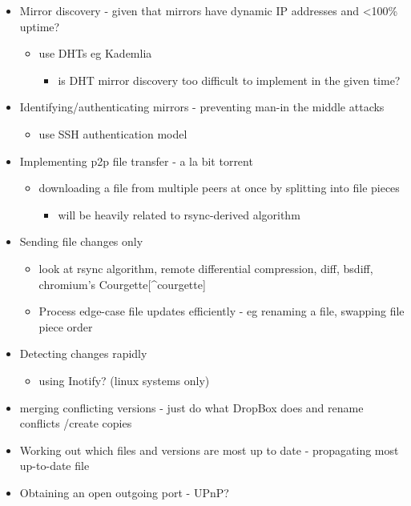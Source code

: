\documentclass[12pt,a4paper,]{book}
\begin{document}
\begin{itemize}
\itemsep1pt\parskip0pt
\item
  Mirror discovery - given that mirrors have dynamic IP addresses and
  \textless{}100\% uptime?

  \begin{itemize}
  \itemsep1pt\parskip0pt
  \item
    use DHTs eg Kademlia

    \begin{itemize}
    \itemsep1pt\parskip0pt
    \item
      is DHT mirror discovery too difficult to implement in the given
      time?
    \end{itemize}
  \end{itemize}
\item
  Identifying/authenticating mirrors - preventing man-in the middle
  attacks

  \begin{itemize}
  \itemsep1pt\parskip0pt
  \item
    use SSH authentication model
  \end{itemize}
\item
  Implementing p2p file transfer - a la bit torrent

  \begin{itemize}
  \itemsep1pt\parskip0pt
  \item
    downloading a file from multiple peers at once by splitting into
    file pieces

    \begin{itemize}
    \itemsep1pt\parskip0pt
    \item
      will be heavily related to rsync-derived algorithm
    \end{itemize}
  \end{itemize}
\item
  Sending file changes only

  \begin{itemize}
  \itemsep1pt\parskip0pt
  \item
    look at rsync algorithm, remote differential compression, diff,
    bsdiff, chromium's Courgette{[}\^{}courgette{]}
  \item
    Process edge-case file updates efficiently - eg renaming a file,
    swapping file piece order
  \end{itemize}
\item
  Detecting changes rapidly

  \begin{itemize}
  \itemsep1pt\parskip0pt
  \item
    using Inotify? (linux systems only)
  \end{itemize}
\item
  merging conflicting versions - just do what DropBox does and rename
  conflicts /create copies
\item
  Working out which files and versions are most up to date - propagating
  most up-to-date file
\item
  Obtaining an open outgoing port - UPnP?
\end{itemize}
\end{document}
